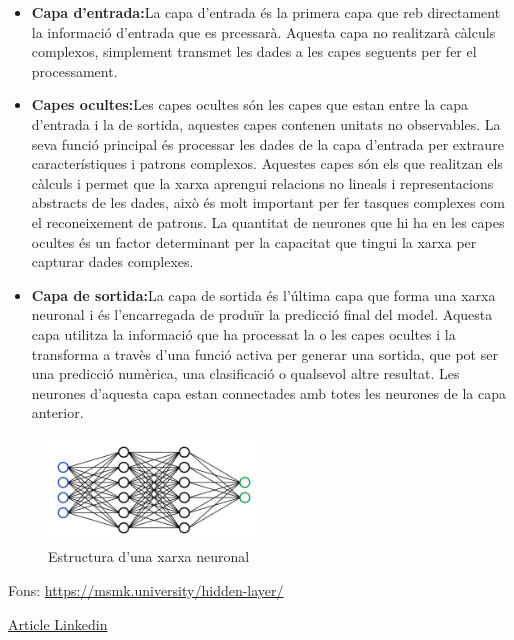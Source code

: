 \begin{itemize}
 \item \textbf{Capa d'entrada:}La capa d'entrada és la primera capa que reb directament la informació d'entrada que es prcessarà. Aquesta capa no realitzarà càlculs complexos, simplement transmet les dades a les capes seguents per fer el processament.
 \item \textbf{Capes ocultes:}Les capes ocultes són les capes que estan entre la capa d'entrada i la de sortida, aquestes capes contenen unitats no observables. La seva funció principal és processar les dades de la capa d'entrada per extraure característiques i patrons complexos. Aquestes capes són els que realitzan els càlculs i permet que la xarxa aprengui relacions no lineals i representacions abstracts de les dades, això és molt important per fer tasques complexes com el reconeixement de patrons. La quantitat de neurones que hi ha en les capes ocultes és un factor determinant per la capacitat que tingui la xarxa per capturar dades complexes.
 \item \textbf{Capa de sortida:}La capa de sortida és l'última capa que forma una xarxa neuronal i és l'encarregada de produïr la predicció final del model. Aquesta capa utilitza la informació que ha processat la o les capes ocultes i la transforma a travès d'una funció activa per generar una sortida, que pot ser una predicció numèrica, una clasificació o qualsevol altre resultat. Les neurones d'aquesta capa estan connectades amb totes les neurones de la capa anterior.
 \end{itemize}


\begin{figure}[h!]
    \centering
    \includegraphics[width=0.5\textwidth]{./figures/xarxa.png}
    \caption{Estructura d'una xarxa neuronal}
\end{figure}

Fons: \href{https://msmk.university/hidden-layer/}{https://msmk.university/hidden-layer/}

\href{https://www.linkedin.com/advice/0/what-some-examples-linear-nonlinear-models-real-world?lang=es&lang=es&originalSubdomain=es}{Article Linkedin}

